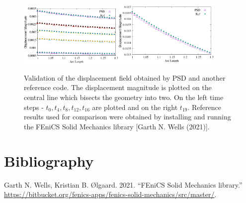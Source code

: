 \begin{figure}[h!]
\centering
\includegraphics[width=0.45\textwidth]{./Images/t5.png}\includegraphics[width=0.45\textwidth]{./Images/t19.png}
\caption{Validation of the displacement field obtained by PSD and another reference code. The displacement magnitude is plotted on the central line which bisects the geometry into two. On the left time steps - $t_0,t_4,t_8,t_{12},t_{16}$ are plotted and on the right $t_{19}$. Reference results used for comparison  were obtained by installing and running the FEniCS Solid Mechanics library [Garth N. Wells (2021)]. \label{comp1}}
\end{figure}

\section*{Bibliography}\label{bibliography}

\hypertarget{refs}{}
\hypertarget{ref-Fenics}{}
Garth N. Wells, Kristian B. Ølgaard. 2021. ``FEniCS Solid Mechanics
library.''
\url{https://bitbucket.org/fenics-apps/fenics-solid-mechanics/src/master/}.

